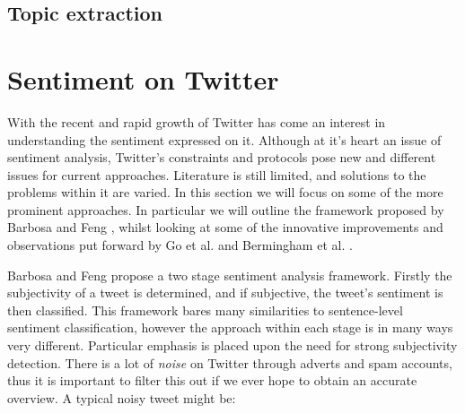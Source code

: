 \begin{comment}

Using adverbs for grading - Benamara et al. \cite{Benamara:2007wz} 

Subjectivity does not necessarily imply a polarised opinion

Broad overview in \cite{Pang:2008wj}

Phrase level sentiment analysis \cite{Wilson:2005tt}

Movie reviews, thumbs up/down \cite{Turney:2002vv} \cite{Pang:2002tu}

\end{comment}

\subsection{Topic extraction}
\label{background:topic_extraction}

\begin{comment}
	2 pass system
		- first look for topic
		- then measure sentiment accordingly
		- Ounis et al. \cite{Macdonald:2007vu}
		- Hurst and Nigam \cite{Nigam:2004ur}, \cite{Nigam:2004vw}
\end{comment}

\section{Sentiment on Twitter}
\label{background:sentiment_on_twitter}

With the recent and rapid growth of Twitter has come an interest in understanding the sentiment expressed on it. Although at it's heart an issue of sentiment analysis, Twitter's constraints and protocols pose new and different issues for current approaches. Literature is still limited, and solutions to the problems within it are varied. In this section we will focus on some of the more prominent approaches. In particular we will outline the framework proposed by Barbosa and Feng \cite{Barbosa:ws}, whilst looking at some of the innovative improvements and observations put forward by Go et al. \cite{Go:2009ut} and Bermingham et al. \cite{Bermingham:2010vh}.

Barbosa and Feng \cite{Barbosa:ws} propose a two stage sentiment analysis framework. Firstly the subjectivity of a tweet is determined, and if subjective, the tweet's sentiment is then classified. This framework bares many similarities to sentence-level sentiment classification, however the approach within each stage is in many ways very different. Particular emphasis is placed upon the need for strong subjectivity detection. There is a lot of \emph{noise} on Twitter through adverts and spam accounts, thus it is important to filter this out if we ever hope to obtain an accurate overview. A typical noisy tweet might be:

